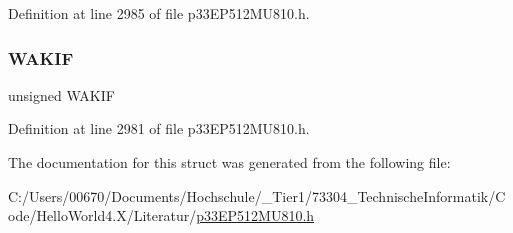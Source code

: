 Definition at line 2985 of file p33\+E\+P512\+M\+U810.\+h.

\mbox{\label{structtag_c1_i_n_t_f_b_i_t_s_aede7ce476b475e1cd66dffa184f2daa1}} 
\subsubsection{\texorpdfstring{W\+A\+K\+IF}{WAKIF}}
{\footnotesize\ttfamily unsigned W\+A\+K\+IF}



Definition at line 2981 of file p33\+E\+P512\+M\+U810.\+h.



The documentation for this struct was generated from the following file\+:\begin{DoxyCompactItemize}
\item 
C\+:/\+Users/00670/\+Documents/\+Hochschule/\+\_\+\+Tier1/73304\+\_\+\+Technische\+Informatik/\+Code/\+Hello\+World4.\+X/\+Literatur/\hyperlink{p33_e_p512_m_u810_8h}{p33\+E\+P512\+M\+U810.\+h}\end{DoxyCompactItemize}
